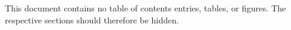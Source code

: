 \documentclass[lot,lof]{fithesis3}
\begin{document}
  This document contains no table of contents entries, tables, or
  figures. The respective sections should therefore be hidden.
\end{document}
